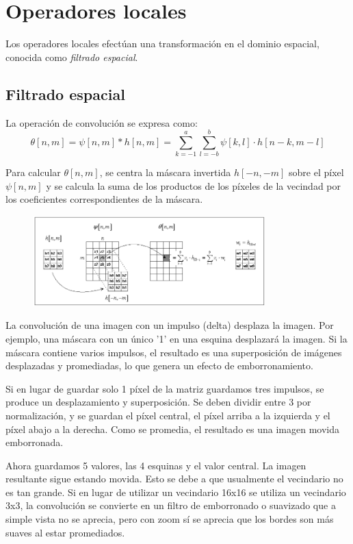 \section{Operadores locales}
Los operadores locales efectúan una transformación en el dominio espacial, conocida como \textit{filtrado espacial}.

\subsection{Filtrado espacial}
La operación de convolución se expresa como:
$$\theta [n,m] = \psi [n,m] \ast h[n,m] = \sum^a_{k=-1} \sum^b_{l=-b} \psi[k,l] \cdot h[n-k,m-l]$$

Para calcular $\theta[n,m]$, se centra la máscara invertida $h[-n,-m]$ sobre el píxel $\psi[n,m]$ y se calcula la suma de los productos de los píxeles de la vecindad por los coeficientes correspondientes de la máscara.

\begin{figure}[h]
\centering
\includegraphics[width = 0.8\textwidth]{figs/convolution.png}
\end{figure}

La convolución de una imagen con un impulso (delta) desplaza la imagen. Por ejemplo, una máscara con un único '1' en una esquina desplazará la imagen. Si la máscara contiene varios impulsos, el resultado es una superposición de imágenes desplazadas y promediadas, lo que genera un efecto de emborronamiento.


Si en lugar de guardar solo 1 píxel de la matriz guardamos tres impulsos, se produce un desplazamiento y superposición. Se deben dividir entre 3 por normalización, y se guardan el píxel central, el píxel arriba a la izquierda y el píxel abajo a la derecha. Como se promedia, el resultado es una imagen movida emborronada.

Ahora guardamos 5 valores, las 4 esquinas y el valor central. La imagen resultante sigue estando movida. Esto se debe a que usualmente el vecindario no es tan grande. Si en lugar de utilizar un vecindario 16x16 se utiliza un vecindario 3x3, la convolución se convierte en un filtro de emborronado o suavizado que a simple vista no se aprecia, pero con zoom sí se aprecia que los bordes son más suaves al estar promediados.

